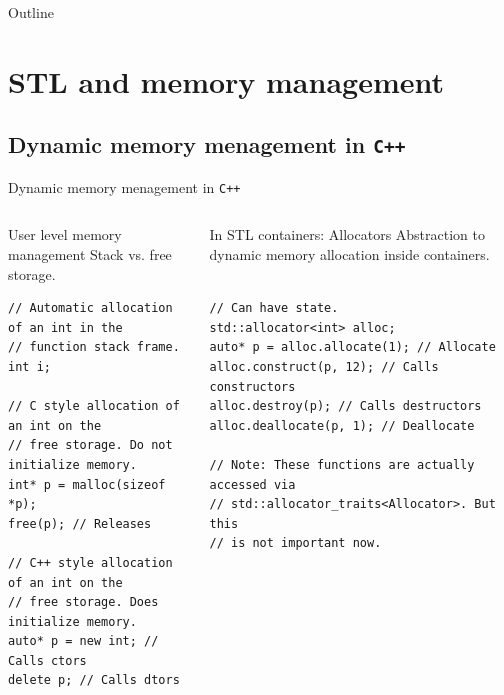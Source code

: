 \documentclass[10pt,aspectratio=169]{beamer}
\begin{document}
\begin{frame}{Outline}
   \tableofcontents
\end{frame}

\section{STL and memory management}

\subsection{Dynamic memory menagement in \texttt{C++}}

\begin{frame}[fragile]{Dynamic memory menagement in \texttt{C++}}
\begin{columns}
\begin{column}[t]{0.45\textwidth}
\begin{block}{User level memory management}
Stack vs. free storage.
\end{block}
\vspace{0.5cm}
\begin{lstlisting}
// Automatic allocation of an int in the
// function stack frame.
int i;

// C style allocation of an int on the
// free storage. Do not initialize memory.
int* p = malloc(sizeof *p);
free(p); // Releases

// C++ style allocation of an int on the
// free storage. Does initialize memory.
auto* p = new int; // Calls ctors
delete p; // Calls dtors
\end{lstlisting}
\end{column}

\begin{column}[t]{0.45\textwidth}
\begin{block}{In STL containers: Allocators}
Abstraction to dynamic memory allocation inside
containers.
\end{block}
\vspace{0.5cm}
\begin{lstlisting}

// Can have state.
std::allocator<int> alloc;
auto* p = alloc.allocate(1); // Allocate
alloc.construct(p, 12); // Calls constructors
alloc.destroy(p); // Calls destructors
alloc.deallocate(p, 1); // Deallocate

// Note: These functions are actually accessed via
// std::allocator_traits<Allocator>. But this
// is not important now.
\end{lstlisting}
\end{column}
\end{columns}
\end{frame}
\end{document}
